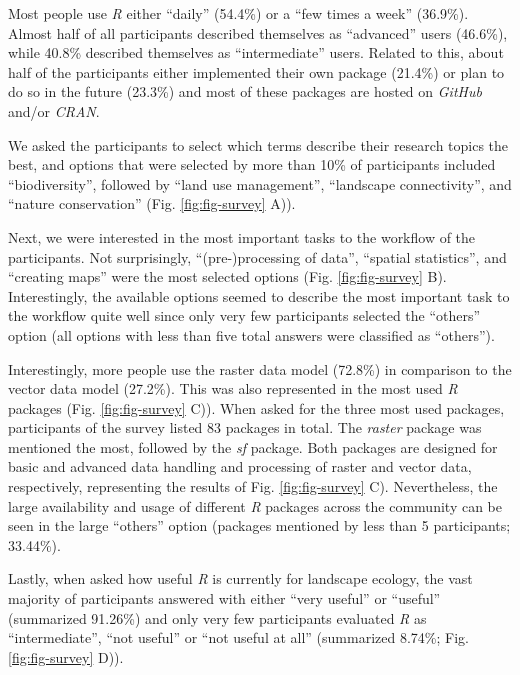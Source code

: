 \documentclass[smallextended]{svjour3}       %
\begin{document}
Most people use \emph{R} either ``daily'' (54.4\%) or a ``few times a week'' (36.9\%).
Almost half of all participants described themselves as ``advanced'' users (46.6\%), while 40.8\% described themselves as ``intermediate'' users.
Related to this, about half of the participants either implemented their own package (21.4\%) or plan to do so in the future (23.3\%) and most of these packages are hosted on \emph{GitHub} and/or \emph{CRAN}.

We asked the participants to select which terms describe their research topics the best, and options that were selected by more than 10\% of participants included ``biodiversity'', followed by ``land use management'', ``landscape connectivity'', and ``nature conservation'' (Fig. \ref{fig:fig-survey} A)).

Next, we were interested in the most important tasks to the workflow of the participants.
Not surprisingly, ``(pre-)processing of data'', ``spatial statistics'', and ``creating maps'' were the most selected options (Fig. \ref{fig:fig-survey} B).
Interestingly, the available options seemed to describe the most important task to the workflow quite well since only very few participants selected the ``others'' option (all options with less than five total answers were classified as ``others'').

Interestingly, more people use the raster data model (72.8\%) in comparison to the vector data model (27.2\%).
This was also represented in the most used \emph{R} packages (Fig. \ref{fig:fig-survey} C)).
When asked for the three most used packages, participants of the survey listed 83 packages in total.
The \emph{raster} package was mentioned the most, followed by the \emph{sf} package.
Both packages are designed for basic and advanced data handling and processing of raster and vector data, respectively, representing the results of Fig. \ref{fig:fig-survey} C).
Nevertheless, the large availability and usage of different \emph{R} packages across the community can be seen in the large ``others'' option (packages mentioned by less than 5 participants; 33.44\%).

Lastly, when asked how useful \emph{R} is currently for landscape ecology, the vast majority of participants answered with either ``very useful'' or ``useful'' (summarized 91.26\%) and only very few participants evaluated \emph{R} as ``intermediate'', ``not useful'' or ``not useful at all'' (summarized 8.74\%; Fig. \ref{fig:fig-survey} D)).
\end{document}
